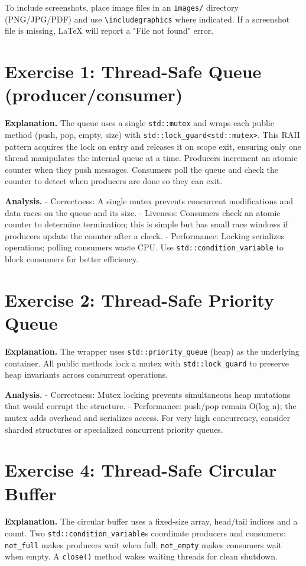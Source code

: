 To include screenshots, place image files in an \texttt{images/} directory (PNG/JPG/PDF) and use \verb|\includegraphics| where indicated. If a screenshot file is missing, LaTeX will report a "File not found" error.

\section{Exercise 1: Thread-Safe Queue (producer/consumer)}
\textbf{Explanation.} The queue uses a single \texttt{std::mutex} and wraps each public method (push, pop, empty, size) with \texttt{std::lock\_guard<std::mutex>}. This RAII pattern acquires the lock on entry and releases it on scope exit, ensuring only one thread manipulates the internal queue at a time. Producers increment an atomic counter when they push messages. Consumers poll the queue and check the counter to detect when producers are done so they can exit.

\textbf{Analysis.}
- Correctness: A single mutex prevents concurrent modifications and data races on the queue and its size.  
- Liveness: Consumers check an atomic counter to determine termination; this is simple but has small race windows if producers update the counter after a check.  
- Performance: Locking serializes operations; polling consumers waste CPU. Use \texttt{std::condition\_variable} to block consumers for better efficiency.

\section{Exercise 2: Thread-Safe Priority Queue}
\textbf{Explanation.} The wrapper uses \texttt{std::priority\_queue} (heap) as the underlying container. All public methods lock a mutex with \texttt{std::lock\_guard} to preserve heap invariants across concurrent operations.

\textbf{Analysis.}
- Correctness: Mutex locking prevents simultaneous heap mutations that would corrupt the structure.  
- Performance: push/pop remain O(log n); the mutex adds overhead and serializes access. For very high concurrency, consider sharded structures or specialized concurrent priority queues.

\section{Exercise 4: Thread-Safe Circular Buffer}
\textbf{Explanation.} The circular buffer uses a fixed-size array, head/tail indices and a count. Two \texttt{std::condition\_variable}s coordinate producers and consumers: \texttt{not\_full} makes producers wait when full; \texttt{not\_empty} makes consumers wait when empty. A \texttt{close()} method wakes waiting threads for clean shutdown.

